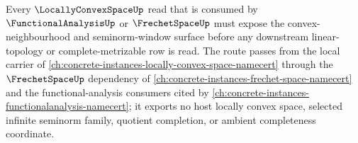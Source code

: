Every $\LocallyConvexSpaceUp$ read that is consumed by $\FunctionalAnalysisUp$ or $\FrechetSpaceUp$ must expose the convex-neighbourhood and seminorm-window surface before any downstream linear-topology or complete-metrizable row is read. The route passes from the local carrier of \autoref{ch:concrete-instances-locally-convex-space-namecert} through the $\FrechetSpaceUp$ dependency of \autoref{ch:concrete-instances-frechet-space-namecert} and the functional-analysis consumers cited by \autoref{ch:concrete-instances-functionalanalysis-namecert}; it exports no host locally convex space, selected infinite seminorm family, quotient completion, or ambient completeness coordinate.
